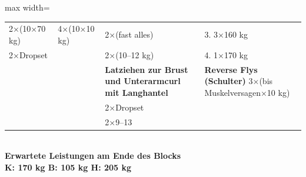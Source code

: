 \documentclass[a4paper,landscape]{article}
\begin{document}
\begin{center}
\begin{adjustbox}{max width=\textwidth}
\begin{tabular}{|p{5cm}|p{5cm}|p{5cm}|p{5cm}|p{5cm}|}
2×(10×70 kg) & 4×(10×10 kg) & 2×(fast alles) & & 3. 3×160 kg \\
2×Dropset & & 2×(10–12 kg) & &  4. 1×170 kg  \\
 & & \textbf{Latziehen zur Brust und Unterarmcurl mit Langhantel} & & \textbf{Reverse Flys (Schulter)} 3×(bis Muskelversagen×10 kg) \\
 & & 2×Dropset & &   \\
 & & 2×9–13 & & \\
\hline
\end{tabular}
\end{adjustbox}
\\[1em]
\textbf{Erwartete Leistungen am Ende des Blocks\\ K: 170 kg \quad B: 105 kg \quad H: 205 kg}
\end{center}
\end{document}
